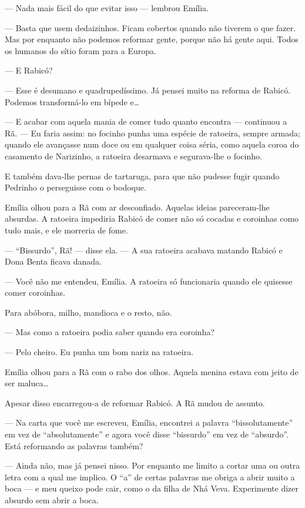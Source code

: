 --- Nada mais fácil do que evitar isso --- lembrou Emília.

--- Basta que usem dedaizinhos. Ficam cobertos quando não tiverem o que
fazer. Mas por enquanto não podemos reformar gente, porque não há gente
aqui. Todos os humanos do sítio foram para a Europa.

--- E Rabicó?

--- Esse é desumano e quadrupedíssimo. Já pensei muito na reforma de
Rabicó. Podemos transformá-lo em bípede e\ldots{}

--- E acabar com aquela mania de comer tudo quanto encontra ---
continuou a Rã. --- Eu faria assim: no focinho punha uma espécie de
ratoeira, sempre armada; quando ele avançasse num doce ou em qualquer
coisa séria, como aquela coroa do casamento de Narizinho, a ratoeira
desarmava e segurava-lhe o focinho.

E também dava-lhe pernas de tartaruga, para que não pudesse fugir quando
Pedrinho o perseguisse com o bodoque.

Emília olhou para a Rã com ar desconfiado. Aquelas ideias pareceram-lhe
absurdas. A ratoeira impediria Rabicó de comer não só cocadas e
coroinhas como tudo mais, e ele morreria de fome.

--- ``Bissurdo'', Rã! --- disse ela. --- A sua ratoeira acabava matando
Rabicó e Dona Benta ficava danada.

--- Você não me entendeu, Emília. A ratoeira só funcionaria quando ele
quisesse comer coroinhas.

Para abóbora, milho, mandioca e o resto, não.

--- Mas como a ratoeira podia saber quando era coroinha?

--- Pelo cheiro. Eu punha um bom nariz na ratoeira.

Emília olhou para a Rã com o rabo dos olhos. Aquela menina estava com
jeito de ser maluca\ldots{}

Apesar disso encarregou-a de reformar Rabicó. A Rã mudou de assunto.

--- Na carta que você me escreveu, Emília, encontrei a palavra
``bissolutamente'' em vez de ``absolutamente'' e agora você disse
``bissurdo'' em vez de ``absurdo''. Está reformando as palavras também?

--- Ainda não, mas já pensei nisso. Por enquanto me limito a cortar uma
ou outra letra com a qual me implico. O ``a'' de certas palavras me
obriga a abrir muito a boca --- e meu queixo pode cair, como o da filha
de Nhá Veva. Experimente dizer absurdo sem abrir a boca.

